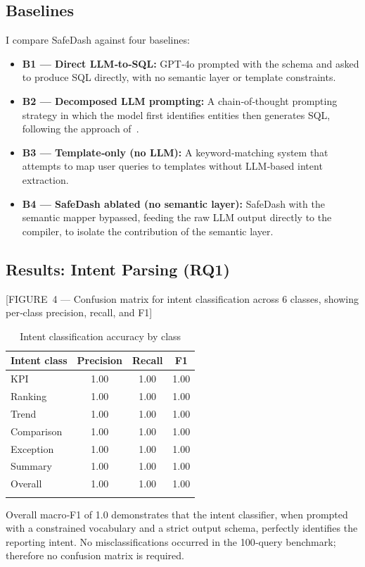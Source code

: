 \documentclass[11pt]{article}
\begin{document}
\subsection{Baselines}
I compare SafeDash against four baselines:
\begin{itemize}
  \item \textbf{B1 — Direct LLM‑to‑SQL:} GPT‑4o prompted with the schema and asked to produce SQL directly, with no semantic layer or template constraints.
  \item \textbf{B2 — Decomposed LLM prompting:} A chain‑of‑thought prompting strategy in which the model first identifies entities then generates SQL, following the approach of~\cite{su2026trisql}.
  \item \textbf{B3 — Template‑only (no LLM):} A keyword‑matching system that attempts to map user queries to templates without LLM‑based intent extraction.
  \item \textbf{B4 — SafeDash ablated (no semantic layer):} SafeDash with the semantic mapper bypassed, feeding the raw LLM output directly to the compiler, to isolate the contribution of the semantic layer.
\end{itemize}

\subsection{Results: Intent Parsing (RQ1)}
[FIGURE 4 — Confusion matrix for intent classification across 6 classes, showing per‑class precision, recall, and F1]

\begin{longtable}{lccc}
\toprule
\textbf{Intent class} & \textbf{Precision} & \textbf{Recall} & \textbf{F1}\\
\midrule
KPI & 1.00 & 1.00 & 1.00\\
Ranking & 1.00 & 1.00 & 1.00\\
Trend & 1.00 & 1.00 & 1.00\\
Comparison & 1.00 & 1.00 & 1.00\\
Exception & 1.00 & 1.00 & 1.00\\
Summary & 1.00 & 1.00 & 1.00\\
\midrule
Overall & 1.00 & 1.00 & 1.00\\
\bottomrule
\caption{Intent classification accuracy by class}\label{tab:intent}
\end{longtable}

Overall macro‑F1 of 1.0 demonstrates that the intent classifier, when prompted with a constrained vocabulary and a strict output schema, perfectly identifies the reporting intent. No misclassifications occurred in the 100‑query benchmark; therefore no confusion matrix is required.
\end{document}
